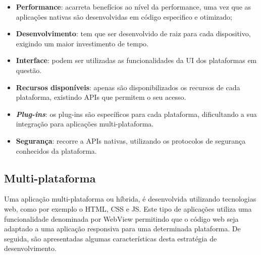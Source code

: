 \begin{itemize}
	\item \textbf{Performance}: acarreta benefícios ao nível da performance, uma vez que as aplicações nativas são desenvolvidas em código especifico e otimizado; 

	
	
	\item \textbf{Desenvolvimento}: tem que ser desenvolvido de raiz para cada dispositivo, exigindo um maior investimento de tempo. 
	
	\item \textbf{Interface}: podem ser utilizadas as funcionalidades da \ac{UI} dos plataformas em questão. 
	
	
	\item \textbf{Recursos disponíveis}: apenas são disponibilizados os recursos de cada plataforma, existindo APIs que permitem o seu acesso. 
	
	

	\item \textbf{\textit{Plug-ins}}: os plug-ins são específicos para cada plataforma, dificultando a sua integração para aplicações multi-plataforma. 
	
	
	\item \textbf{Segurança}: recorre a APIs nativas, utilizando os protocolos de segurança conhecidos da plataforma. 
	
	
\end{itemize}


\subsection{Multi-plataforma}



Uma aplicação multi-plataforma ou híbrida, é desenvolvida utilizando tecnologias web, como por exemplo o \ac{HTML}, \ac{CSS} e \ac{JS}. Este tipo de aplicações utiliza uma funcionalidade denominada por WebView permitindo que o código web seja adaptado a uma aplicação responsiva para uma determinada plataforma. De seguida, são apresentadas algumas características desta estratégia de desenvolvimento\cite{Ibm2012a}. 








